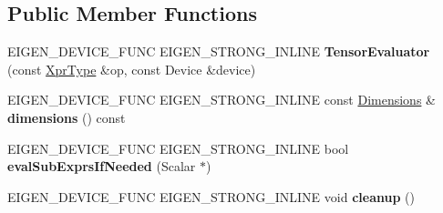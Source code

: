 \subsection*{Public Member Functions}
\begin{DoxyCompactItemize}
\item 
\mbox{\label{struct_eigen_1_1_tensor_evaluator_3_01const_01_tensor_reverse_op_3_01_reverse_dimensions_00_01_arg_type_01_4_00_01_device_01_4_a23185f16484a4b75c1848bb85229613e}} 
E\+I\+G\+E\+N\+\_\+\+D\+E\+V\+I\+C\+E\+\_\+\+F\+U\+NC E\+I\+G\+E\+N\+\_\+\+S\+T\+R\+O\+N\+G\+\_\+\+I\+N\+L\+I\+NE {\bfseries Tensor\+Evaluator} (const \hyperlink{class_eigen_1_1_tensor_reverse_op}{Xpr\+Type} \&op, const Device \&device)
\item 
\mbox{\label{struct_eigen_1_1_tensor_evaluator_3_01const_01_tensor_reverse_op_3_01_reverse_dimensions_00_01_arg_type_01_4_00_01_device_01_4_a6a3b8ab020c3d18ad1c79f9cf8fd1f5f}} 
E\+I\+G\+E\+N\+\_\+\+D\+E\+V\+I\+C\+E\+\_\+\+F\+U\+NC E\+I\+G\+E\+N\+\_\+\+S\+T\+R\+O\+N\+G\+\_\+\+I\+N\+L\+I\+NE const \hyperlink{struct_eigen_1_1_d_sizes}{Dimensions} \& {\bfseries dimensions} () const
\item 
\mbox{\label{struct_eigen_1_1_tensor_evaluator_3_01const_01_tensor_reverse_op_3_01_reverse_dimensions_00_01_arg_type_01_4_00_01_device_01_4_a3f2b733375ce6fb18888fc24f658480c}} 
E\+I\+G\+E\+N\+\_\+\+D\+E\+V\+I\+C\+E\+\_\+\+F\+U\+NC E\+I\+G\+E\+N\+\_\+\+S\+T\+R\+O\+N\+G\+\_\+\+I\+N\+L\+I\+NE bool {\bfseries eval\+Sub\+Exprs\+If\+Needed} (Scalar $\ast$)
\item 
\mbox{\label{struct_eigen_1_1_tensor_evaluator_3_01const_01_tensor_reverse_op_3_01_reverse_dimensions_00_01_arg_type_01_4_00_01_device_01_4_a9f1340a5427f08f63f43612a02e08c40}} 
E\+I\+G\+E\+N\+\_\+\+D\+E\+V\+I\+C\+E\+\_\+\+F\+U\+NC E\+I\+G\+E\+N\+\_\+\+S\+T\+R\+O\+N\+G\+\_\+\+I\+N\+L\+I\+NE void {\bfseries cleanup} ()

\end{DoxyCompactItemize}
